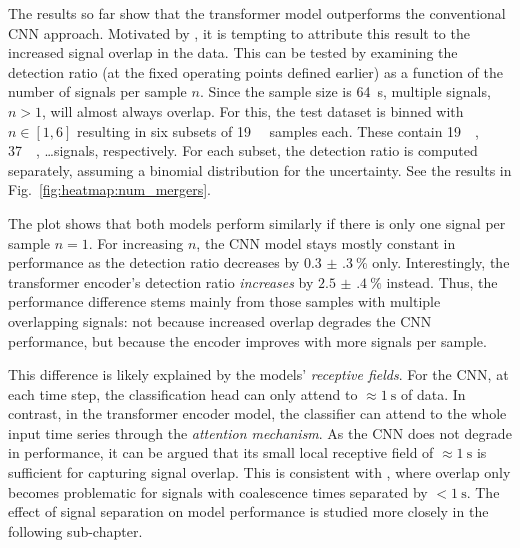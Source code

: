
The results so far show that the transformer model outperforms the conventional CNN approach. Motivated by \cite{Papalini_2025}, it is tempting to attribute this result to the increased signal overlap in the data. This can be tested by examining the detection ratio (at the fixed operating points defined earlier) as a function of the number of signals per sample $n$. Since the sample size is \SI{64}{\second}, multiple signals, $n>1$, will almost always overlap. For this, the test dataset is binned with $n\in[1,6]$ resulting in six subsets of \SI{19}{\kilo\nothing} samples each. These contain \SI{19}{\kilo\nothing}, \SI{37}{\kilo\nothing}, \dots signals, respectively. For each subset, the detection ratio is computed separately, assuming a binomial distribution for the uncertainty. See the results in Fig.~\ref{fig:heatmap:num_mergers}.

The plot shows that both models perform similarly if there is only one signal per sample $n=1$. For increasing $n$, the CNN model stays mostly constant in performance as the detection ratio decreases by $\SI{0.3(3)}{\percent}$ only.
Interestingly, the transformer encoder's detection ratio \emph{increases} by $\SI{2.5(4)}{\percent}$ instead. Thus, the performance difference stems mainly from those samples with multiple overlapping signals: not because increased overlap degrades the CNN performance, but because the encoder improves with more signals per sample.

This difference is likely explained by the models' \emph{receptive fields}. For the CNN, at each time step, the classification head can only attend to $\approx\SI{1}{\second}$ of data. In contrast, in the  transformer encoder model, the classifier can attend to the whole input time series through the \emph{attention mechanism}.
As the CNN does not degrade in performance, it can be argued that its small local receptive field of $\approx\SI{1}{\second}$ is sufficient for capturing signal overlap. This is consistent with \cite{Relton_2022}, where overlap only becomes problematic for signals with coalescence times separated by $<\SI{1}{\second}$. The effect of signal separation on model performance is studied more closely in the following sub-chapter.

